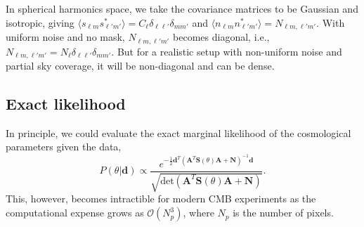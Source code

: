\documentclass[twocolumn]{../common/aa}
\begin{document}
In spherical harmonics space, we take the covariance matrices to be Gaussian and isotropic, giving $\langle s_{\ell m}s_{\ell' m'}^* \rangle = C_{\ell} \delta_{\ell \ell'}\delta_{mm'}$ and $\langle n_{\ell m}n_{\ell' m'}^* \rangle = N_{\ell m, \ell' m'}$. With uniform noise and no mask, $N_{\ell m, \ell' m'} $ becomes diagonal, i.e., $N_{\ell m, \ell' m'} = N_\ell \delta_{\ell \ell'}\delta_{mm'}$. But for a realistic setup with non-uniform noise and partial sky coverage, it will be non-diagonal and can be dense.

\subsection{Exact likelihood}
\label{sec:exact-likelihood}

In principle, we could evaluate the exact marginal likelihood of the cosmological parameters given the data, 
\begin{equation}
    P(\theta | \textbf{d}) \propto \frac{e^{-\frac12 \textbf{d}^T (\textbf{A}^T \textbf{S}(\theta) \textbf{A} + \textbf{N})^{-1}\textbf{d}}}{\sqrt{\text{det}\left(\textbf{A}^T \textbf{S}(\theta) \textbf{A} + \textbf{N}\right)}}.
\end{equation}
This, however, becomes intractible for modern CMB experiments as the computational expense grows as $\mathcal{O}(N_p^3)$, where $N_p$ is the number of pixels.
\end{document}

